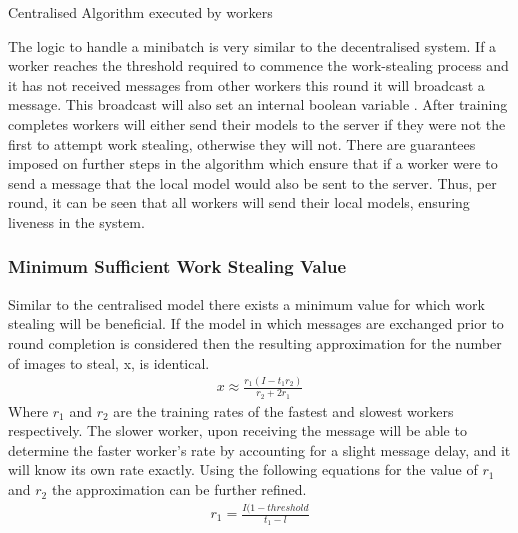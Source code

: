\documentclass[12pt]{article}
\begin{document}
\IncMargin{1em}
\begin{algorithm}[H]
 \BlankLine
 \caption{Centralised Algorithm executed by workers}
 \label{DecentralisedAlgorithmWorkerBeginRound}
\end{algorithm}
\DecMargin{1em}
\medskip

The logic to handle a minibatch is very similar to the decentralised system. If a worker reaches the threshold required to commence the work-stealing process and it has not received messages from other workers this round it will broadcast a  message. This broadcast will also set an internal boolean variable . After training completes workers will either send their models to the server if they were not the first to attempt work stealing, otherwise they will not.
\newline
\newline
There are guarantees imposed on further steps in the algorithm which ensure that if a worker were to send a  message that the local model would also be sent to the server. Thus, per round, it can be seen that all workers will send their local models, ensuring liveness in the system.

\subsubsection{Minimum Sufficient Work Stealing Value}
Similar to the centralised model there exists a minimum value for which work stealing will be beneficial. If the model in which messages are exchanged prior to round completion is considered then the resulting approximation for the number of images to steal, x,  is identical.
\begin{align*}
x \approx \frac{r_1(I - t_1r_2)}{r_2 + 2r_1}
\end{align*}
Where $r_1$ and $r_2$ are the training rates of the fastest and slowest workers respectively. The slower worker, upon receiving the message will be able to determine the faster worker's rate by accounting for a slight message delay, and it will know its own rate exactly.
\newline
Using the following equations for the value of $r_1$ and $r_2$ the approximation can be further refined.
\begin{align*}
r_1 = \frac{I(1-threshold}{t_1- l}
\end{align*}
\end{document}
